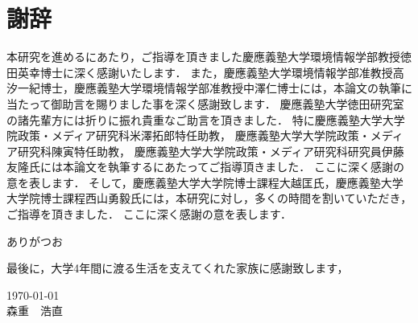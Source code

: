 \chapter*{謝辞}

本研究を進めるにあたり，ご指導を頂きました慶應義塾大学環境情報学部教授徳田英幸博士に深く感謝いたします．
また，慶應義塾大学環境情報学部准教授高汐一紀博士，慶應義塾大学環境情報学部准教授中澤仁博士には，本論文の執筆に当たって御助言を賜りました事を深く感謝致します．
慶應義塾大学徳田研究室の諸先輩方には折りに振れ貴重なご助言を頂きました．
特に慶應義塾大学大学院政策・メディア研究科米澤拓郎特任助教，
慶應義塾大学大学院政策・メディア研究科陳寅特任助教，
慶應義塾大学大学院政策・メディア研究科研究員伊藤友隆氏には本論文を執筆するにあたってご指導頂きました．
ここに深く感謝の意を表します．
そして，慶應義塾大学大学院博士課程大越匡氏，慶應義塾大学大学院博士課程西山勇毅氏には，本研究に対し，多くの時間を割いていただき，ご指導を頂きました．
ここに深く感謝の意を表します．

ありがつお

最後に，大学4年間に渡る生活を支えてくれた家族に感謝致します，



\begin{flushright}
\today\\
森重　浩直
\end{flushright}
